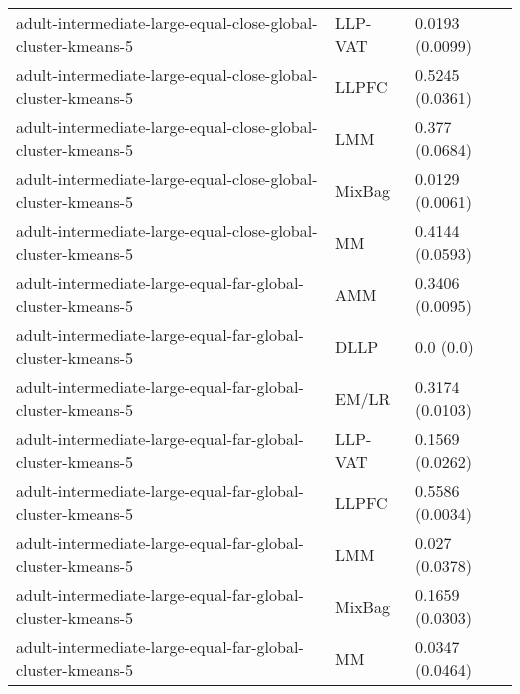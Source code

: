 \begin{longtable}{lll}
                                                 adult-intermediate-large-equal-close-global-cluster-kmeans-5 &   LLP-VAT &                           0.0193 (0.0099) \\
                                                 adult-intermediate-large-equal-close-global-cluster-kmeans-5 &     LLPFC &                           0.5245 (0.0361) \\
                                                 adult-intermediate-large-equal-close-global-cluster-kmeans-5 &       LMM &                            0.377 (0.0684) \\
                                                 adult-intermediate-large-equal-close-global-cluster-kmeans-5 &    MixBag &                           0.0129 (0.0061) \\
                                                 adult-intermediate-large-equal-close-global-cluster-kmeans-5 &        MM &                           0.4144 (0.0593) \\
                                                   adult-intermediate-large-equal-far-global-cluster-kmeans-5 &       AMM &                           0.3406 (0.0095) \\
                                                   adult-intermediate-large-equal-far-global-cluster-kmeans-5 &      DLLP &                                 0.0 (0.0) \\
                                                   adult-intermediate-large-equal-far-global-cluster-kmeans-5 &     EM/LR &                           0.3174 (0.0103) \\
                                                   adult-intermediate-large-equal-far-global-cluster-kmeans-5 &   LLP-VAT &                           0.1569 (0.0262) \\
                                                   adult-intermediate-large-equal-far-global-cluster-kmeans-5 &     LLPFC &                           0.5586 (0.0034) \\
                                                   adult-intermediate-large-equal-far-global-cluster-kmeans-5 &       LMM &                            0.027 (0.0378) \\
                                                   adult-intermediate-large-equal-far-global-cluster-kmeans-5 &    MixBag &                           0.1659 (0.0303) \\
                                                   adult-intermediate-large-equal-far-global-cluster-kmeans-5 &        MM &                           0.0347 (0.0464) \\

\end{longtable}
